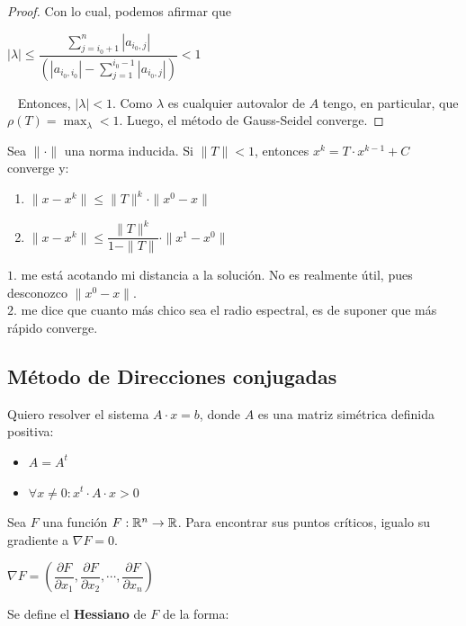 \documentclass[]{article}
\begin{document}
\begin{prop}
\begin{proof}
		Con lo cual, podemos afirmar que
		\begin{center}
			$|\lambda| \leq \dfrac{\displaystyle \sum_{j=i_0+1}^n{|a_{i_0,j}|}}{\displaystyle \left(|a_{i_0,i_0}| - \sum_{j=1}^{i_0-1}{|a_{i_0,j}|}\right)} < 1$
		\end{center}

		~\newline
		Entonces, $|\lambda|<1$. Como $\lambda$ es cualquier autovalor de $A$ tengo, en particular, que $\displaystyle \rho(T) = \max_\lambda < 1$. Luego, el método de Gauss-Seidel converge.
	\end{proof}
\end{prop}

\begin{prop}
	Sea $\|\cdot\|$ una norma inducida. Si $\|T\|<1$, entonces $x^k = T\cdot x^{k-1} + C$ converge y:
	\begin{enumerate}
		\item $\|x-x^k\|\leq \|T\|^k\cdot\|x^0-x\|$
		\item $\|x-x^k\|\leq \dfrac{\|T\|^k}{1-\|T\|}\cdot \|x^1-x^0\|$
	\end{enumerate}
\end{prop}

$1.$ me está acotando mi distancia a la solución. No es realmente útil, pues desconozco $\|x^0-x\|$.\\
$2.$ me dice que cuanto más chico sea el radio espectral, es de suponer que más rápido converge.


\subsection{Método de Direcciones conjugadas}
Quiero resolver el sistema $A\cdot x = b$, donde $A$ es una matriz simétrica definida positiva:
\begin{itemize}
	\item $A=A^t$
	\item $\forall x \neq 0: x^t\cdot A\cdot x > 0$
\end{itemize}

Sea $F$ una función $F:\mathbb{R}^n\to\mathbb{R}$. Para encontrar sus puntos críticos, igualo su gradiente a $\nabla F = 0$.
\begin{center}
	$\nabla F = \left(\dfrac{\partial F}{\partial x_1} , \dfrac{\partial F}{\partial x_2} , \cdots , \dfrac{\partial F}{\partial x_n}\right)$
\end{center}

Se define el \textbf{Hessiano} de $F$ de la forma:
\end{document}
